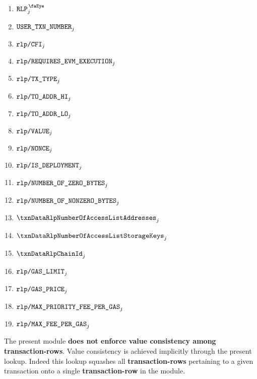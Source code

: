 \begin{description}
\begin{multicols}{2}
			\begin{enumerate}
				\item $\isUserTxnRlpView                        _{j}$
				\item $\texttt{USER}\texttt{\_}\texttt{TXN\_NUMBER}                   _{j}$
				\item $\texttt{rlp}\texttt{/}{\texttt{\texttt{CFI}}}                           _{j}$
				\item $\texttt{rlp}\texttt{/}{\texttt{\texttt{REQUIRES\_EVM\_EXECUTION}}}          _{j}$
				\item $\texttt{rlp}\texttt{/}{\texttt{TX\_TYPE}}                        _{j}$
				\item $\texttt{rlp}\texttt{/}{\texttt{TO\_ADDR\_HI}}                      _{j}$
				\item $\texttt{rlp}\texttt{/}{\texttt{TO\_ADDR\_LO}}                      _{j}$
				\item $\texttt{rlp}\texttt{/}{\texttt{VALUE}}                         _{j}$
				\item $\texttt{rlp}\texttt{/}{\texttt{NONCE}}                         _{j}$
				\item $\texttt{rlp}\texttt{/}{\texttt{IS\_DEPLOYMENT}}                         _{j}$
				\item $\texttt{rlp}\texttt{/}{\texttt{NUMBER\_OF\_ZERO\_BYTES}}             _{j}$
				\item $\texttt{rlp}\texttt{/}{\texttt{NUMBER\_OF\_NONZERO\_BYTES}}          _{j}$
				\item $\txnDataRlpNumberOfAccessListAddresses   _{j}$
				\item $\txnDataRlpNumberOfAccessListStorageKeys _{j}$
				\item $\txnDataRlpChainId                       _{j}$
				\item $\texttt{rlp}\texttt{/}{\texttt{GAS\_LIMIT}}                      _{j}$
				\item $\texttt{rlp}\texttt{/}{\texttt{GAS\_PRICE}}                      _{j}$
				\item $\texttt{rlp}\texttt{/}{\texttt{MAX\_PRIORITY\_FEE\_PER\_GAS}}          _{j}$
				\item $\texttt{rlp}\texttt{/}{\texttt{MAX\_FEE\_PER\_GAS}}                  _{j}$
			\end{enumerate} 
		\end{multicols}
\end{description}
\saNote{}
The present module \textbf{does not enforce value consistency among transaction-rows}.
Value consistency is achieved implicitly through the present lookup.
Indeed this lookup squashes all \textbf{transaction-rows} pertaining to a given transaction
onto a single \textbf{transaction-row} in the \rlpTxnMod{} module.
